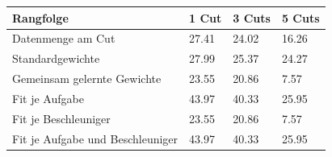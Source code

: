 \begin{tabular}{@{}llll@{}}
\toprule
Rangfolge & 1 Cut & 3 Cuts & 5 Cuts \\
\midrule
Datenmenge am Cut & 27.41 & 24.02 & 16.26 \\
Standardgewichte & 27.99 & 25.37 & 24.27 \\
Gemeinsam gelernte Gewichte & 23.55 & 20.86 & 7.57 \\
Fit je Aufgabe & 43.97 & 40.33 & 25.95 \\
Fit je Beschleuniger & 23.55 & 20.86 & 7.57 \\
Fit je Aufgabe und Beschleuniger & 43.97 & 40.33 & 25.95 \\
\bottomrule
\end{tabular}
